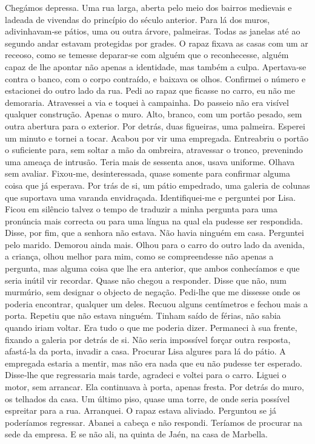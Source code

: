 Chegámos depressa. Uma rua larga, aberta pelo meio dos bairros medievais
e ladeada de vivendas do princípio do século anterior. Para lá dos
muros, adivinhavam­‑se pátios, uma ou outra árvore, palmeiras. Todas as
janelas até ao segundo andar estavam protegidas por grades. O rapaz
fixava as casas com um ar receoso, como se temesse deparar­‑se com
alguém que o reconhecesse, alguém capaz de lhe apontar não apenas a
identidade, mas também a culpa. Apertava­‑se contra o banco, com o corpo
contraído, e baixava os olhos. Confirmei o número e estacionei do outro
lado da rua. Pedi ao rapaz que ficasse no carro, eu não me demoraria.
Atravessei a via e toquei à campainha. Do passeio não era visível
qualquer construção. Apenas o muro. Alto, branco, com um portão pesado,
sem outra abertura para o exterior. Por detrás, duas figueiras, uma
palmeira. Esperei um minuto e tornei a tocar. Acabou por vir uma
empregada. Entreabriu o portão o suficiente para, sem soltar a mão da
ombreira, atravessar o tronco, prevenindo uma ameaça de intrusão. Teria
mais de sessenta anos, usava uniforme. Olhava sem avaliar. Fixou­‑me,
desinteressada, quase somente para confirmar alguma coisa que já
esperava. Por trás de si, um pátio empedrado, uma galeria de colunas que
suportava uma varanda envidraçada. Identifiquei­‑me e perguntei por
Lisa. Ficou em silêncio talvez o tempo de traduzir a minha pergunta para
uma pronúncia mais correcta ou para uma língua na qual ela pudesse ser
respondida. Disse, por fim, que a senhora não estava. Não havia ninguém
em casa. Perguntei pelo marido. Demorou ainda mais. Olhou para o carro
do outro lado da avenida, a criança, olhou melhor para mim, como se
compreendesse não apenas a pergunta, mas alguma coisa que lhe era
anterior, que ambos conhecíamos e que seria inútil vir recordar. Quase
não chegou a responder. Disse que não, num murmúrio, sem designar o
objecto de negação. Pedi­‑lhe que me dissesse onde os poderia encontrar,
qualquer um deles. Recuou alguns centímetros e fechou mais a porta.
Repetiu que não estava ninguém. Tinham saído de férias, não sabia quando
iriam voltar. Era tudo o que me poderia dizer. Permaneci à sua frente,
fixando a galeria por detrás de si. Não seria impossível forçar outra
resposta, afastá­‑la da porta, invadir a casa. Procurar Lisa algures
para lá do pátio. A empregada estaria a mentir, mas não era nada que eu
não pudesse ter esperado. Disse­‑lhe que regressaria mais tarde,
agradeci e voltei para o carro. Liguei o motor, sem arrancar. Ela
continuava à porta, apenas fresta. Por detrás do muro, os telhados da
casa. Um último piso, quase uma torre, de onde seria possível espreitar
para a rua. Arranquei. O rapaz estava aliviado. Perguntou se já
poderíamos regressar. Abanei a cabeça e não respondi. Teríamos de
procurar na sede da empresa. E se não ali, na quinta de Jaén, na casa de
Marbella.

